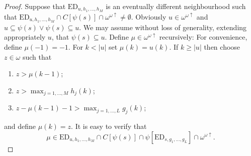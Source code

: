 \documentclass[12pt]{amsart}
\theoremstyle{plain}
\theoremstyle{definition}
\theoremstyle{remark}
\newcommand{\incrbaire}{\omega^{\omega \uparrow}}
\newcommand{\EventuallyDifferent}[2]{\mathrm{ED}_{#1,#2}}
\begin{document}
\begin{proof}
  Suppose that $\EventuallyDifferent{u}{h_1,\ldots, h_M}$ is an eventually
  different neighbourhood such that
  $\EventuallyDifferent{u}{h_1,\ldots, h_M} \cap C[\psi(s)] \cap \incrbaire \not= \emptyset$.
  Obviously $u\in \incrbaire$ and $u \subseteq \psi(s) \vee \psi(s) \subseteq u$.
  We may assume without loss of generality, extending appropriately $u$, that
  $\psi(s) \subseteq u$. Define $\mu \in \incrbaire$ recursively:
  For convenience, define $\mu(-1) = -1$.
  For $k < |u|$ set $\mu(k) = u(k)$.
  If $k \geq |u|$ then choose $z \in \omega$ such that
  \begin{enumerate}
  \item
    $z > \mu(k - 1)$;
  \item
    $z > \max_{j = 1,\ldots, M} h_j(k)$;
  \item
    $z - \mu(k - 1) - 1 > \max_{j = 1,\ldots, L} g_j(k)$;
  \end{enumerate}
  and define $\mu(k) = z$.
  It is easy to verify that
  \[ \mu \in \EventuallyDifferent{u}{h_1,\ldots, h_M} \cap C[\psi(s)] \cap
    \psi[\EventuallyDifferent{s}{g_1, \ldots, g_L}] \cap \incrbaire.
  \]
\end{proof}
\end{document}
